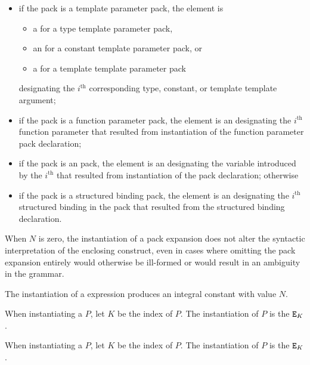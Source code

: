 \documentclass{wg21}
\begin{document}
\begin{itemize}
\item
if the pack is a template parameter pack, the element is
\begin{itemize}
    \item
    a  for a type template parameter pack,
    \item
    an  for a constant template parameter pack, or
    \item
    a  for a template template parameter pack
\end{itemize}
designating the $i^\text{th}$ corresponding
type, constant, or template template argument;

\item
if the pack is a function parameter pack, the element is an
designating the $i^\text{th}$ function parameter
that resulted from instantiation of
the function parameter pack declaration;

\item
if the pack is an  pack,
the element is an 
designating the variable introduced by
the $i^\text{th}$ 
that resulted from instantiation of
the  pack declaration;
otherwise

\item
if the pack is a structured binding pack,
the element is an 
designating the $i^\textrm{th}$ structured binding in the pack
that resulted from the structured binding declaration.
\end{itemize}
When $N$ is zero, the instantiation of a pack expansion
does not alter the syntactic interpretation of the enclosing construct,
even in cases where omitting the pack expansion entirely would
otherwise be ill-formed or would result in an ambiguity in the grammar.

\pnum
The instantiation of a  expression produces
an integral constant with value $N$.

\pnum
When instantiating a  $P$,
let $K$ be the index of $P$.
The instantiation of $P$ is the  $\texttt{E}_K$.

\pnum
When instantiating a  $P$,
let $K$ be the index of $P$.
The instantiation of $P$ is the  $\texttt{E}_K$.
\end{document}
